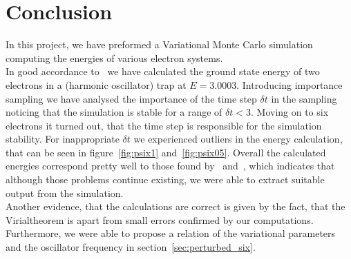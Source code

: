 \section{Conclusion}\label{sec:conclusion}
In this project, we have preformed a Variational Monte Carlo simulation computing the energies of various electron systems.\\
In good accordance to~\cite{hogberget2013} we have calculated the ground state energy of two electrons in a (harmonic oscillator) trap at $E=3.0003$. Introducing importance sampling we have analysed the importance of the time step $\delta t$ in the sampling noticing that the simulation is stable for a range of $\delta t < 3$. Moving on to six electrons it turned out, that the time step is responsible for the simulation stability. For inappropriate $\delta t$ we experienced outliers in the energy calculation, that can be seen in figure~\ref{fig:psix1} and~\ref{fig:psix05}. Overall the calculated energies correspond pretty well to those found by~\cite{hogberget2013} and~\cite{lohne2011}, which indicates that although those problems continue existing, we were able to extract suitable output from the simulation.\\
Another evidence, that the calculations are correct is given by the fact, that the Virialtheorem is apart from small errors confirmed by our computations.\\
Furthermore, we were able to propose a relation of the variational parameters and the oscillator frequency in section~\ref{sec:perturbed_six}. 
